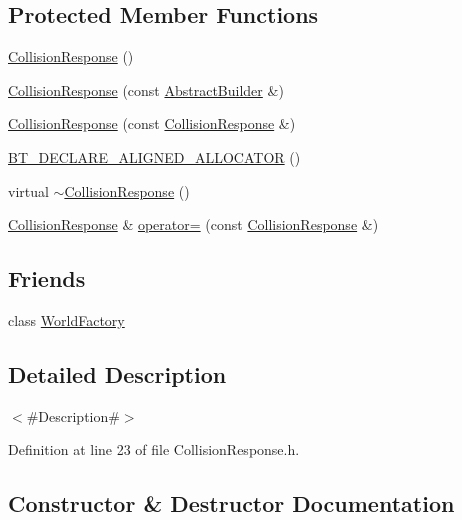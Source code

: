 \subsection*{Protected Member Functions}
\begin{DoxyCompactItemize}
\item 
\mbox{\hyperlink{classnjli_1_1_collision_response_ae4bc0371f4d64b19378edbb0fde924cc}{Collision\+Response}} ()
\item 
\mbox{\hyperlink{classnjli_1_1_collision_response_a24e7db05ad1d9b24bd59634614eb87ff}{Collision\+Response}} (const \mbox{\hyperlink{classnjli_1_1_abstract_builder}{Abstract\+Builder}} \&)
\item 
\mbox{\hyperlink{classnjli_1_1_collision_response_a0487102f92add4ba625883d0f67e8db6}{Collision\+Response}} (const \mbox{\hyperlink{classnjli_1_1_collision_response}{Collision\+Response}} \&)
\item 
\mbox{\hyperlink{classnjli_1_1_collision_response_a848e4b5a53a32e6e73ad89da46f9ff9b}{B\+T\+\_\+\+D\+E\+C\+L\+A\+R\+E\+\_\+\+A\+L\+I\+G\+N\+E\+D\+\_\+\+A\+L\+L\+O\+C\+A\+T\+OR}} ()
\item 
virtual \mbox{\hyperlink{classnjli_1_1_collision_response_a88dde609dd266005c44139194cae2c88}{$\sim$\+Collision\+Response}} ()
\item 
\mbox{\hyperlink{classnjli_1_1_collision_response}{Collision\+Response}} \& \mbox{\hyperlink{classnjli_1_1_collision_response_a23e9dfaa306170c47404a4ba988d445a}{operator=}} (const \mbox{\hyperlink{classnjli_1_1_collision_response}{Collision\+Response}} \&)
\end{DoxyCompactItemize}
\subsection*{Friends}
\begin{DoxyCompactItemize}
\item 
class \mbox{\hyperlink{classnjli_1_1_collision_response_acb96ebb09abe8f2a37a915a842babfac}{World\+Factory}}
\end{DoxyCompactItemize}


\subsection{Detailed Description}
$<$\#\+Description\#$>$ 

Definition at line 23 of file Collision\+Response.\+h.



\subsection{Constructor \& Destructor Documentation}
\mbox{\label{classnjli_1_1_collision_response_ae4bc0371f4d64b19378edbb0fde924cc}} 
